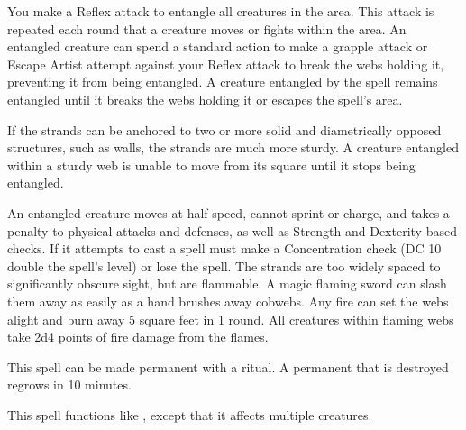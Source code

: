 \spellrng{\rngclose}
\begin{spelleffect}
    You make a Reflex attack to entangle all creatures in the area. This attack is repeated each round that a creature moves or fights within the area. An entangled creature can spend a standard action to make a grapple attack or Escape Artist attempt against your Reflex attack to break the webs holding it, preventing it from being entangled. A creature entangled by the spell remains entangled until it breaks the webs holding it or escapes the spell's area.
  \par If the strands can be anchored to two or more solid and diametrically opposed structures, such as walls, the strands are much more sturdy. A creature entangled within a sturdy web is unable to move from its square until it stops being entangled.
\end{spelleffect}
\begin{spellnotes}
  An entangled creature moves at half speed, cannot sprint or charge, and takes a  penalty to physical attacks and defenses, as well as Strength and Dexterity-based checks. If it attempts to cast a spell must make a Concentration check (DC 10 \add double the spell's level) or lose the spell.
  The strands are too widely spaced to significantly obscure sight, but are flammable. A magic flaming sword can slash them away as easily as a hand brushes away cobwebs. Any fire can set the webs alight and burn away 5 square feet in 1 round. All creatures within flaming webs take 2d4 points of fire damage from the flames.
  
  This spell can be made permanent with a  ritual. A permanent  that is destroyed regrows in 10 minutes.
\end{spellnotes}

\begin{spelleffect}
  This spell functions like , except that it affects multiple creatures.
\end{spelleffect}

